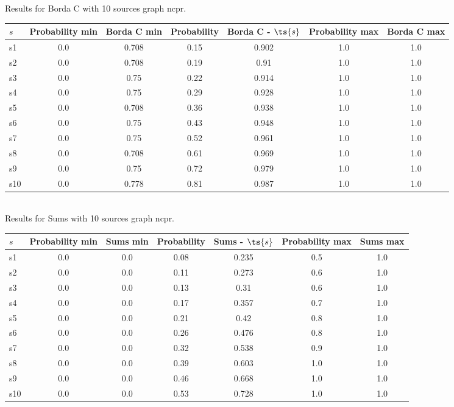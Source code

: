 \documentclass{article}
\begin{document}
\noindent Results for Borda C with 10 sources graph ncpr.

\noindent\begin{tabular}{|l|c|c|c|c|c|c|}
\hline
$s$& Probability min & Borda C min & Probability & Borda C - $\ts{s}$ & Probability max & Borda C max\\
\hline
s1 &0.0 & 0.708 & 0.15 & 0.902 & 1.0 & 1.0\\
\hline
s2 &0.0 & 0.708 & 0.19 & 0.91 & 1.0 & 1.0\\
\hline
s3 &0.0 & 0.75 & 0.22 & 0.914 & 1.0 & 1.0\\
\hline
s4 &0.0 & 0.75 & 0.29 & 0.928 & 1.0 & 1.0\\
\hline
s5 &0.0 & 0.708 & 0.36 & 0.938 & 1.0 & 1.0\\
\hline
s6 &0.0 & 0.75 & 0.43 & 0.948 & 1.0 & 1.0\\
\hline
s7 &0.0 & 0.75 & 0.52 & 0.961 & 1.0 & 1.0\\
\hline
s8 &0.0 & 0.708 & 0.61 & 0.969 & 1.0 & 1.0\\
\hline
s9 &0.0 & 0.75 & 0.72 & 0.979 & 1.0 & 1.0\\
\hline
s10 &0.0 & 0.778 & 0.81 & 0.987 & 1.0 & 1.0\\
\hline
\end{tabular}\\

\noindent Results for Sums with 10 sources graph ncpr.

\noindent\begin{tabular}{|l|c|c|c|c|c|c|}
\hline
$s$& Probability min & Sums min & Probability & Sums - $\ts{s}$ & Probability max & Sums max\\
\hline
s1 &0.0 & 0.0 & 0.08 & 0.235 & 0.5 & 1.0\\
\hline
s2 &0.0 & 0.0 & 0.11 & 0.273 & 0.6 & 1.0\\
\hline
s3 &0.0 & 0.0 & 0.13 & 0.31 & 0.6 & 1.0\\
\hline
s4 &0.0 & 0.0 & 0.17 & 0.357 & 0.7 & 1.0\\
\hline
s5 &0.0 & 0.0 & 0.21 & 0.42 & 0.8 & 1.0\\
\hline
s6 &0.0 & 0.0 & 0.26 & 0.476 & 0.8 & 1.0\\
\hline
s7 &0.0 & 0.0 & 0.32 & 0.538 & 0.9 & 1.0\\
\hline
s8 &0.0 & 0.0 & 0.39 & 0.603 & 1.0 & 1.0\\
\hline
s9 &0.0 & 0.0 & 0.46 & 0.668 & 1.0 & 1.0\\
\hline
s10 &0.0 & 0.0 & 0.53 & 0.728 & 1.0 & 1.0\\
\hline
\end{tabular}\\
\end{document}

